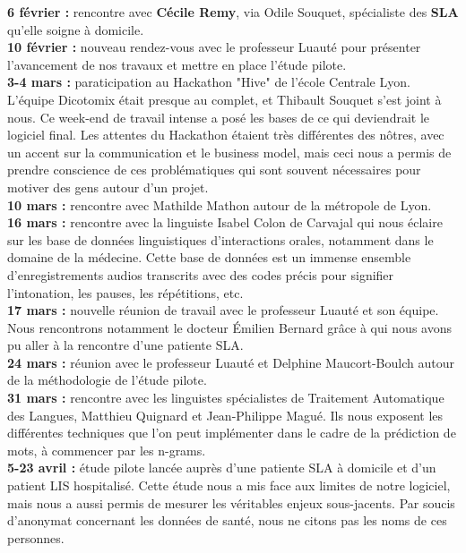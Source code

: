 \documentclass[11pt,a4paper]{article}
\theoremstyle{plain}
\theoremstyle{definition}
\begin{document}
\textbf{6 février : } rencontre avec \textbf{Cécile Remy}, via Odile Souquet, spécialiste des \textbf{SLA} qu'elle soigne à domicile. \\

\textbf{10 février : } nouveau rendez-vous avec le professeur Luauté pour présenter l'avancement de nos travaux et mettre en place l'étude pilote. \\

\textbf{3-4 mars : } paraticipation au Hackathon "Hive" de l'école Centrale Lyon. L'équipe Dicotomix était presque au complet, et Thibault Souquet s'est joint à nous. Ce week-end de travail intense a posé les bases de ce qui deviendrait le logiciel final. Les attentes du Hackathon étaient très différentes des nôtres, avec un accent sur la communication et le business model, mais ceci nous a permis de prendre conscience de ces problématiques qui sont souvent nécessaires pour motiver des gens autour d'un projet. \\

\textbf{10 mars : } rencontre avec Mathilde Mathon autour de la métropole de Lyon. \\

\textbf{16 mars : } rencontre avec la linguiste Isabel Colon de Carvajal qui nous éclaire sur les base de données linguistiques d'interactions orales, notamment dans le domaine de la médecine. Cette base de données est un immense ensemble d'enregistrements audios transcrits avec des codes précis pour signifier l'intonation, les pauses, les répétitions, etc. \\

\textbf{17 mars : } nouvelle réunion de travail avec le professeur Luauté et son équipe. Nous rencontrons notamment le docteur Émilien Bernard grâce à qui nous avons pu aller à la rencontre d'une patiente SLA. \\

\textbf{24 mars : } réunion avec le professeur Luauté et Delphine Maucort-Boulch autour de la méthodologie de l'étude pilote. \\

\textbf{31 mars : } rencontre avec les linguistes spécialistes de Traitement Automatique des Langues, Matthieu Quignard et Jean-Philippe Magué. Ils nous exposent les différentes techniques que l'on peut implémenter dans le cadre de la prédiction de mots, à commencer par les n-grams.\\

\textbf{5-23 avril : } étude pilote lancée auprès d'une patiente SLA à domicile et d'un patient LIS hospitalisé. Cette étude nous a mis face aux limites de notre logiciel, mais nous a aussi permis de mesurer les véritables enjeux sous-jacents. Par soucis d'anonymat concernant les données de santé, nous ne citons pas les noms de ces personnes.
    
\end{document}

